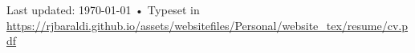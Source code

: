 \documentclass[10pt, a4paper]{article}
\begin{document}
\vfill{}

\begin{center}
{\scriptsize  Last updated: \today\- •\- 
Typeset in \href{http://nitens.org/taraborelli/cvtex}{
\XeTeX }\\
\href{http://rjbaraldi.github.io/cv}{https://rjbaraldi.github.io/assets/websitefiles/Personal/website\_tex/resume/cv.pdf}}
\end{center}
\end{document}
